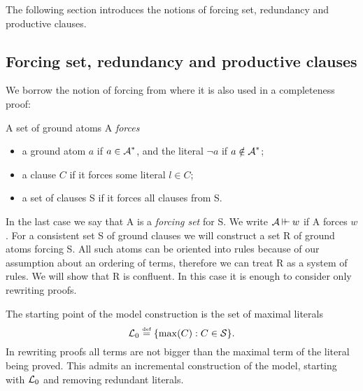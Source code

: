 \noindent The following section introduces the notions of forcing set,
redundancy and productive clauses.

\subsection{Forcing set, redundancy and productive clauses} \label{se:forcing-set}

We borrow the notion of forcing from \cite{PP} where it is also used in a
completeness proof:
\begin{DEFINITION} \label{def:forcing}
A set of ground atoms \C A {\em forces}
\begin{itemize}\MyLPar
\item  a ground atom  $a$ if \(a\in\mbox {$\cal A$}^\ast\), and the literal \(\neg a\) if 
\(a\notin \mbox {$\cal A$}^\ast\);
\item  a clause $C$ if it forces some literal \(l\in C\);
\item  a set of clauses \C S if it forces all clauses from \C S.
\end{itemize}
\end{DEFINITION}

In the last case we say that \C A is a {\em forcing set} for \C S.
We write $\mathrel{\mbox {$\cal A$} \mathbin{\vdash\!\!\vdash} w}$ if \C A forces $w$.
For a consistent set \C S of ground clauses we will construct a set \C R of
ground atoms forcing \C S.
All such atoms can be oriented into rules because of our assumption about an
ordering of terms, therefore we can treat \C R  as a
system of rules. We will show that \C R is confluent.
In this case it is enough to consider only rewriting proofs.

The starting point of the model construction is
the set of maximal literals
\begin{equation} \label{eq:max-atoms-set}
\mbox {$\cal L$}_0 \mathrel {\stackrel {\mbox {\tiny def}}{=}} \{\max(C) : C\in \mbox {$\cal S$}\}.
\end{equation}
%
In rewriting proofs all terms are not bigger than the maximal term of the 
literal being proved.  This admits an incremental construction of the model, 
starting with $\mbox {$\cal L$}_0$ and removing redundant literals. %


